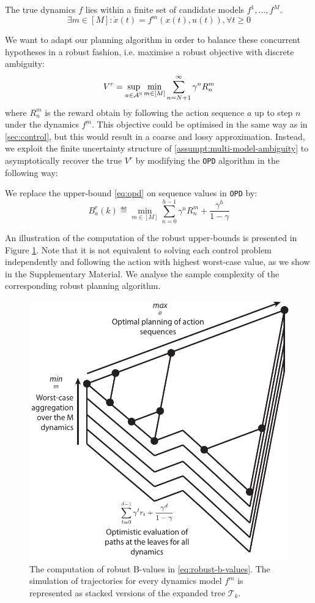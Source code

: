 \documentclass{article}
\begin{document}
\begin{assumption}
\label{assumpt:multi-model-ambiguity}
The true dynamics $f$ lies within a finite set of candidate models $f^1, \dots, f^M$.
\begin{equation*}
\exists m\in[M]: \dot{x}(t) = f^m(x(t), u(t)), \forall t\geq 0
\end{equation*}
\end{assumption}
We want to adapt our planning algorithm in order to balance these concurrent hypotheses in a robust fashion, i.e. maximise a robust objective with discrete ambiguity:
\begin{equation}
\label{eq:robust-objective-discrete}
V^r = \sup_{a\in\mathcal{A}^{\mathbb{N}}}\min_{m\in[M]} \sum_{n=N+1}^\infty \gamma^n R_n^m
\end{equation}
where $R_n^m$ is the reward obtain by following the action sequence $a$ up to step $n$ under the dynamics $f^m$.
This objective could be optimised in the same way as in \autoref{sec:control}, but this would result in a coarse and lossy approximation. Instead, we exploit the finite uncertainty structure of \autoref{assumpt:multi-model-ambiguity} to asymptotically recover the true $V^r$ by modifying the \texttt{OPD} algorithm in the following way:

\begin{definition} We replace the upper-bound \eqref{eq:opd} on sequence values in \texttt{OPD} by:
\begin{equation}
\label{eq:robust-b-values}
B_a^r(k)  \eqdef \min_{m\in[M]} \sum_{n=0}^{h-1} \gamma^n R_n^m  + \frac{\gamma^h}{1-\gamma}
\end{equation}
\end{definition}
An illustration of the computation of the robust upper-bounds is presented in Figure \ref{fig:drop}. Note that it is not equivalent to solving each control problem independently and following the action with highest worst-case value, as we show in the Supplementary Material. We analyse the sample complexity of the corresponding robust planning algorithm.

\begin{figure}
\centering
\includegraphics[width=0.4\linewidth]{img/robust-control-tree}
\caption{The computation of robust B-values in \eqref{eq:robust-b-values}. The simulation of trajectories for every dynamics model $f^m$ is represented as stacked versions of the expanded tree $\mathcal{T}_k$.}
\label{fig:drop}
\end{figure}
\end{document}
